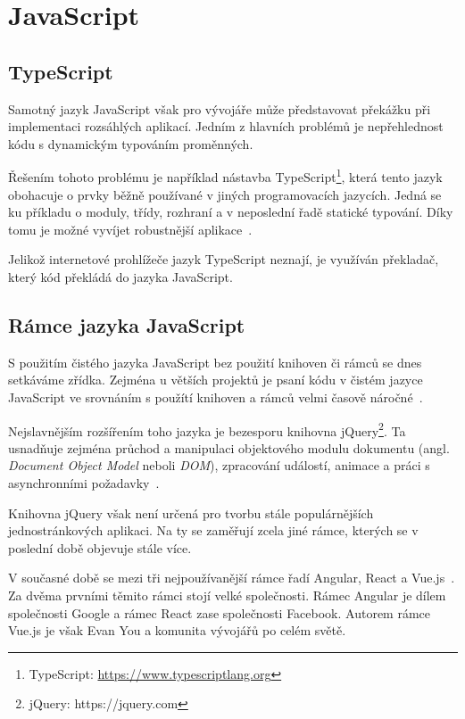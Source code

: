 \section{JavaScript}
\blindtext

\subsection{TypeScript}
Samotný jazyk JavaScript však pro vývojáře může představovat překážku při implementaci rozsáhlých aplikací. Jedním z hlavních problémů je nepřehlednost kódu s dynamickým typováním proměnných.

Řešením tohoto problému je například nástavba TypeScript\footnote{TypeScript: \url{https://www.typescriptlang.org}}, která tento jazyk obohacuje o prvky běžně používané v jiných programovacích jazycích. Jedná se ku příkladu o moduly, třídy, rozhraní a v neposlední řadě statické typování. Díky tomu je možné vyvíjet robustnější aplikace~\cite{bib:typescript}.
 
Jelikož internetové prohlížeče jazyk TypeScript neznají, je využíván překladač, který kód překládá do jazyka JavaScript.

\subsection{Rámce jazyka JavaScript}
S použitím čistého jazyka JavaScript bez použití knihoven či rámců se dnes setkáváme zřídka. Zejména u větších projektů je psaní kódu v čistém jazyce JavaScript ve srovnáním s použítí knihoven a rámců velmi časově náročné~\cite{bib:vanilla-js}.

Nejslavnějším rozšířením toho jazyka je bezesporu knihovna jQuery\footnote{jQuery: https://jquery.com}. Ta usnadňuje zejména průchod a manipulaci objektového modulu dokumentu (angl. \emph{Document Object Model} neboli \emph{DOM}), zpracování událostí, animace a práci s asynchronními požadavky~\cite{bib:jquery}.

Knihovna jQuery však není určená pro tvorbu stále populárnějších jednostránkových aplikaci. Na ty se zaměřují zcela jiné rámce, kterých se v poslední době objevuje stále více.

V současné době se mezi tři nejpoužívanější rámce řadí Angular, React a Vue.js~\cite{bib:js-framework}. Za dvěma prvními těmito rámci stojí velké společnosti. Rámec Angular je dílem společnosti Google a rámec React zase společnosti Facebook. Autorem rámce Vue.js je však Evan You a komunita vývojářů po celém světě.

